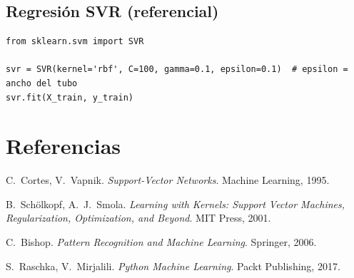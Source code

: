 \documentclass[11pt,a4paper]{article}
\begin{document}
\subsection*{Regresión SVR (referencial)}
\begin{lstlisting}
from sklearn.svm import SVR

svr = SVR(kernel='rbf', C=100, gamma=0.1, epsilon=0.1)  # epsilon = ancho del tubo
svr.fit(X_train, y_train)
\end{lstlisting}

\section*{Referencias}
\small
\begin{enumerate}[leftmargin=1.6em,label={[\arabic*]}]
  \item C.\ Cortes, V.\ Vapnik. \textit{Support-Vector Networks}. Machine Learning, 1995.
  \item B.\ Schölkopf, A.\ J.\ Smola. \textit{Learning with Kernels: Support Vector Machines,
  Regularization, Optimization, and Beyond}. MIT Press, 2001.
  \item C.\ Bishop. \textit{Pattern Recognition and Machine Learning}. Springer, 2006.
  \item S.\ Raschka, V.\ Mirjalili. \textit{Python Machine Learning}. Packt Publishing, 2017.
\end{enumerate}
\end{document}
